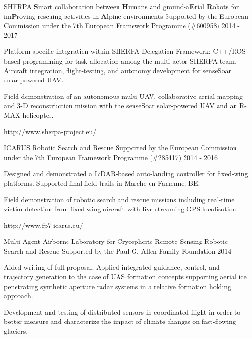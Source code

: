 \begin{cventries}
\cvprojwideentry
  	{SHERPA} %
  	{\textbf{S}mart collaboration between \textbf{H}umans and ground-a\textbf{E}rial \textbf{R}obots for im\textbf{P}roving rescuing activities in \textbf{A}lpine environments} %
    {Supported by the European Commission under the 7th European Framework Programme (\#600958)} %
    {2014 - 2017} %
    {
      \begin{cvitems} %
        \item {Platform specific integration within SHERPA Delegation Framework: C++/ROS based programming for task allocation among the multi-actor SHERPA team. Aircraft integration, flight-testing, and autonomy development for senseSoar solar-powered UAV.}
        \item {Field demonstration of an autonomous multi-UAV, collaborative aerial mapping and 3-D reconstruction mission with the senseSoar solar-powered UAV and an R-MAX helicopter.}
      \end{cvitems}
    } %
    {http://www.sherpa-project.eu/} %
    {\showprojectdescriptions}

\cvprojwideentry
  	{ICARUS} %
  	{Robotic Search and Rescue} %
    {Supported by the European Commission under the 7th European Framework Programme (\#285417)} %
    {2014 - 2016} %
    {
      \begin{cvitems} %
        \item {Designed and demonstrated a LiDAR-based auto-landing controller for fixed-wing platforms. Supported final field-trails in Marche-en-Famenne, BE.}
        \item {Field demonstration of robotic search and rescue missions including real-time victim detection from fixed-wing aircraft with live-streaming GPS localization.}
      \end{cvitems}
    } %
    {http://www.fp7-icarus.eu/} %
    {\showprojectdescriptions}

\cvprojwideentry
  	{Multi-Agent Airborne Laboratory for Cryospheric Remote Sensing} %
  	{Robotic Search and Rescue} %
    {Supported by the Paul G. Allen Family Foundation} %
    {2014} %
    {
      \begin{cvitems} %
        \item {Aided writing of full proposal. Applied integrated guidance, control, and trajectory generation to the case of UAS formation concepts supporting aerial ice penetrating synthetic aperture radar systems in a relative formation holding approach.}
        \item {Development and testing of distributed sensors in coordinated flight in order to better measure and characterize the impact of climate changes on fast-flowing glaciers.}
      \end{cvitems}
    } %
    {} %
    {\showprojectdescriptions}
    

\end{cventries}
